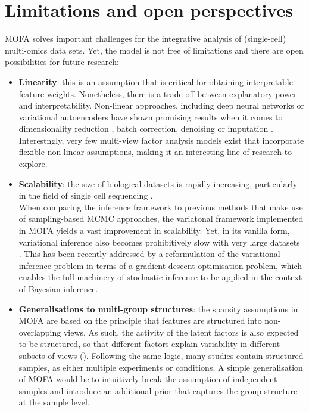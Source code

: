 \section{Limitations and open perspectives}

MOFA solves important challenges for the integrative analysis of (single-cell) multi-omics data sets. Yet, the model is not free of limitations and there are open possibilities for future research:

\begin{itemize}

	\item \textbf{Linearity}: this is an assumption that is critical for obtaining interpretable feature weights. Nonetheless, there is a trade-off between explanatory power and interpretability\cite{Kuhn}. Non-linear approaches, including deep neural networks or variational autoencoders have shown promising results when it comes to dimensionality reduction \cite{Lin2017,Ding2018,Lopez2018}, batch correction\cite{Lopez2018}, denoising \cite{Eraslan2019} or imputation \cite{Lin2016}. Interestngly, very few multi-view factor analysis models exist that incorporate flexible non-linear assumptions, making it an interesting line of research to explore.

	\item \textbf{Scalability}: the size of biological datasets is rapidly increasing, particularly in the field of single cell sequencing \cite{Svensson2018,Cao2019}. \\
	When comparing the inference framework to previous methods that make use of sampling-based MCMC approaches, the variatonal framework implemented in MOFA yields a vast improvement in scalability. Yet, in its vanilla form, variational inference also becomes prohibitively slow with very large datasets \cite{Hoffman2013,Blei2016,Hoffman2014}. This has been recently addressed by a reformulation of the variational inference problem in terms of a gradient descent optimisation problem, which enables the full machinery of stochastic inference to be applied in the context of Bayesian inference.

	\item \textbf{Generalisations to multi-group structures}: the sparsity assumptions in MOFA are based on the principle that features are structured into non-overlapping views. As such, the activity of the latent factors is also expected to be structured, so that different factors explain variability in different subsets of views (). Following the same logic, many studies contain structured samples, as either multiple experiments or conditions. A simple generalisation of MOFA would be to intuitively break the assumption of independent samples and introduce an additional prior that captures the group structure at the sample level.


\end{itemize}
